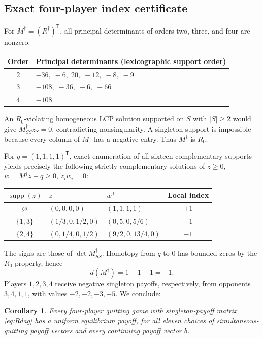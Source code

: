\documentclass[11pt,a4paper]{article}
\newtheorem{corollary}[theorem]{Corollary}
\theoremstyle{definition}
\theoremstyle{remark}
\newcommand{\supp}{\operatorname{supp}}
\begin{document}
\subsection{Exact four-player index certificate}
For $M^\dagger=(R^\dagger)^{\mathsf T}$, all principal determinants of orders two, three, and four are nonzero:
\begin{center}
\begin{tabular}{cl}\toprule
Order & Principal determinants (lexicographic support order)\\\midrule
$2$ & $-36,\;-6,\;20,\;-12,\;-8,\;-9$\\
$3$ & $-108,\;-36,\;-6,\;-66$\\
$4$ & $-108$\\\bottomrule
\end{tabular}
\end{center}
An $R_0$-violating homogeneous LCP solution supported on $S$ with $|S|\ge2$ would give $M^\dagger_{SS}z_S=0$, contradicting nonsingularity. A singleton support is impossible because every column of $M^\dagger$ has a negative entry. Thus $M^\dagger$ is $R_0$.

For $q=(1,1,1,1)^{\mathsf T}$, exact enumeration of all sixteen complementary supports yields precisely the following strictly complementary solutions of $z\ge0$, $w=M^\dagger z+q\ge0$, $z_iw_i=0$:
\begin{center}
\renewcommand{\arraystretch}{1.15}
\begin{tabular}{cllc}\toprule
$\supp(z)$ & $z^{\mathsf T}$ & $w^{\mathsf T}$ & Local index\\\midrule
$\varnothing$ & $(0,0,0,0)$ & $(1,1,1,1)$ & $+1$\\
$\{1,3\}$ & $(1/3,0,1/2,0)$ & $(0,5,0,5/6)$ & $-1$\\
$\{2,4\}$ & $(0,1/4,0,1/2)$ & $(9/2,0,13/4,0)$ & $-1$\\\bottomrule
\end{tabular}
\end{center}
The signs are those of $\det M^\dagger_{SS}$. Homotopy from $q$ to $0$ has bounded zeros by the $R_0$ property, hence
\begin{equation}\label{eq:negdegree}
d(M^\dagger)=1-1-1=-1.
\end{equation}
Players $1,2,3,4$ receive negative singleton payoffs, respectively, from opponents $3,4,1,1$, with values $-2,-2,-3,-5$. We conclude:
\begin{corollary}\label{cor:all}
Every four-player quitting game with singleton-payoff matrix \eqref{eq:Rdag} has a uniform equilibrium payoff, for all eleven choices of simultaneous-quitting payoff vectors and every continuing payoff vector $b$.
\end{corollary}
\end{document}
